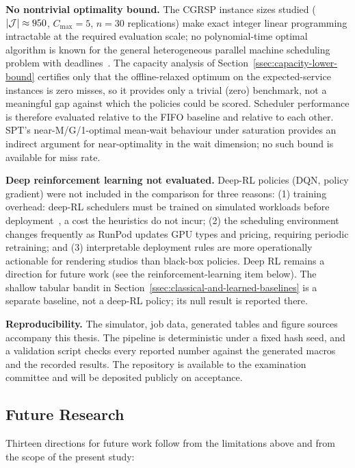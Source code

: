 {\textbf{No nontrivial optimality bound.} The CGRSP instance sizes studied ($|\mathcal{J}| \approx 950$, $C_{\max}=5$, $n=30$ replications) make exact integer linear programming intractable at the required evaluation scale; no polynomial-time optimal algorithm is known for the general heterogeneous parallel machine scheduling problem with deadlines~\cite{pinedo2016scheduling}. The capacity analysis of Section~\ref{ssec:capacity-lower-bound} certifies only that the offline-relaxed optimum on the expected-service instances is zero misses, so it provides only a trivial (zero) benchmark, not a meaningful gap against which the policies could be scored. Scheduler performance is therefore evaluated relative to the FIFO baseline and relative to each other. SPT's near-M/G/1-optimal mean-wait behaviour under saturation provides an indirect argument for near-optimality in the wait dimension; no such bound is available for miss rate.

\textbf{Deep reinforcement learning not evaluated.} Deep-RL policies (DQN, policy gradient) were not included in the comparison for three reasons: (1) training overhead: deep-RL schedulers must be trained on simulated workloads before deployment~\cite{chen2023gpu}, a cost the heuristics do not incur; (2) the scheduling environment changes frequently as RunPod updates GPU types and pricing, requiring periodic retraining; and (3) interpretable deployment rules are more operationally actionable for rendering studios than black-box policies. Deep RL remains a direction for future work (see the reinforcement-learning item below). The shallow tabular bandit in Section~\ref{ssec:classical-and-learned-baselines} is a separate baseline, not a deep-RL policy; its null result is reported there.

\noindent\textbf{Reproducibility.} The simulator, job data, generated tables and figure sources accompany this thesis. The pipeline is deterministic under a fixed hash seed, and a validation script checks every reported number against the generated macros and the recorded results. The repository is available to the examination committee and will be deposited publicly on acceptance.

\subsection{Future Research}
\label{ssec:future-research}

Thirteen directions for future work follow from the limitations above and from the scope of the present study:

}
